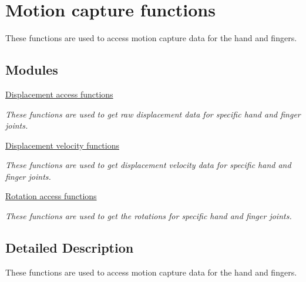 \hypertarget{group__motion_capture}{}\section{Motion capture functions}
\label{group__motion_capture}


These functions are used to access motion capture data for the hand and fingers.  


\subsection*{Modules}
\begin{DoxyCompactItemize}
\item 
\hyperlink{group__displacement_access}{Displacement access functions}
\begin{DoxyCompactList}\small\item\em These functions are used to get raw displacement data for specific hand and finger joints. \end{DoxyCompactList}\item 
\hyperlink{group__velocity_access}{Displacement velocity functions}
\begin{DoxyCompactList}\small\item\em These functions are used to get displacement velocity data for specific hand and finger joints. \end{DoxyCompactList}\item 
\hyperlink{group__rotation_access}{Rotation access functions}
\begin{DoxyCompactList}\small\item\em These functions are used to get the rotations for specific hand and finger joints. \end{DoxyCompactList}\end{DoxyCompactItemize}


\subsection{Detailed Description}
These functions are used to access motion capture data for the hand and fingers. 

